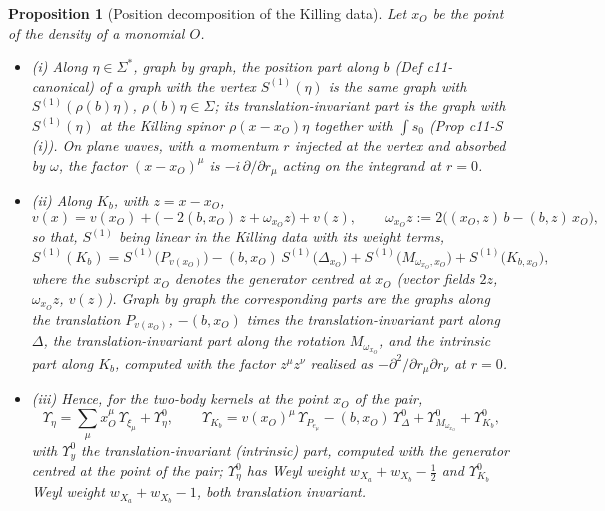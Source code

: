 \documentclass[11pt]{article}
\numberwithin{equation}{section}
\theoremstyle{plain}
\newtheorem{proposition}[theorem]{Proposition}
\theoremstyle{definition}
\begin{document}
\begin{proposition}[Position decomposition of the Killing data]
\label{prop:qs-posdec}
Let $x_O$ be the point of the density of a monomial $O$.
\begin{itemize}
\item (i) Along $\eta\in\Sigma^*$, graph by graph, the position part along $b$ (Def c11-canonical) of a graph with the vertex $S^{(1)}(\eta)$ is the same graph with $S^{(1)}(\rho(b)\eta)$, $\rho(b)\eta\in\Sigma$; its translation-invariant part is the graph with $S^{(1)}(\eta)$ at the Killing spinor $\rho(x-x_O)\eta$ together with $\int s_0$ (Prop c11-S (i)). On plane waves, with a momentum $r$ injected at the vertex and absorbed by $\omega$, the factor $(x-x_O)^\mu$ is $-i\,\partial/\partial r_\mu$ acting on the integrand at $r=0$.
\item (ii) Along $K_b$, with $z=x-x_O$,
\[
v(x)=v(x_O)+\big(-2(b,x_O)\,z+\omega_{x_O}z\big)+v(z),\qquad \omega_{x_O}z:=2\big((x_O,z)\,b-(b,z)\,x_O\big),
\]
so that, $S^{(1)}$ being linear in the Killing data with its weight terms,
\begin{equation}
S^{(1)}(K_b)=S^{(1)}\big(P_{v(x_O)}\big)-(b,x_O)\,S^{(1)}\big(\Delta_{x_O}\big)+S^{(1)}\big(M_{\omega_{x_O},x_O}\big)+S^{(1)}\big(K_{b,x_O}\big),
\label{eq:qs-Kdec}
\end{equation}
where the subscript $x_O$ denotes the generator centred at $x_O$ (vector fields $2z$, $\omega_{x_O}z$, $v(z)$). Graph by graph the corresponding parts are the graphs along the translation $P_{v(x_O)}$, $-(b,x_O)$ times the translation-invariant part along $\Delta$, the translation-invariant part along the rotation $M_{\omega_{x_O}}$, and the intrinsic part along $K_b$, computed with the factor $z^\mu z^\nu$ realised as $-\partial^2/\partial r_\mu\partial r_\nu$ at $r=0$.
\item (iii) Hence, for the two-body kernels at the point $x_O$ of the pair,
\[
\Upsilon_\eta=\sum_\mu x_O^\mu\,\Upsilon_{\xi_\mu}+\Upsilon^0_\eta,\qquad \Upsilon_{K_b}=v(x_O)^\mu\,\Upsilon_{P_{e_\mu}}-(b,x_O)\,\Upsilon^0_\Delta+\Upsilon^0_{M_{\omega_{x_O}}}+\Upsilon^0_{K_b},
\]
with $\Upsilon^0_y$ the translation-invariant (intrinsic) part, computed with the generator centred at the point of the pair; $\Upsilon^0_\eta$ has Weyl weight $w_{X_a}+w_{X_b}-\tfrac12$ and $\Upsilon^0_{K_b}$ Weyl weight $w_{X_a}+w_{X_b}-1$, both translation invariant.
\end{itemize}
\end{proposition}
\end{document}
